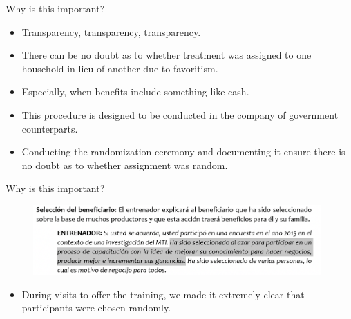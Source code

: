 \documentclass[aspectratio=169]{beamer}
\begin{document}
\begin{frame}{Why is this important?}

\begin{itemize}[<default overlay specification>]
	\item<1>  Transparency, transparency, transparency.
	\item<1>  There can be no doubt as to whether treatment was assigned to one household in lieu of another due to favoritism.
	\item<1>  Especially, when benefits include something like cash.
	\item<1>  This procedure is designed to be conducted in the company of government counterparts.
	\item<1> Conducting the randomization ceremony and documenting it ensure there is no doubt as to whether assignment was random.
\end{itemize}

\end{frame}


\begin{frame}{Why is this important?}

	\begin{figure}
		\centering
		\includegraphics[width=110mm]{img/Transparency}
	\end{figure}
	
\begin{itemize}[<default overlay specification>]
	\item<1>  During visits to offer the training, we made it extremely clear that participants were chosen randomly.
\end{itemize}

\end{frame}
\end{document}
